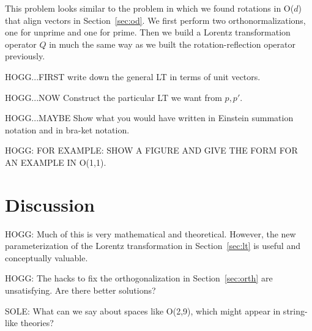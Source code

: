 \documentclass{article}
\newcommand{\secref}[1]{Section~\ref{#1}}
\begin{document}
This problem looks similar to the problem in which we found rotations in O($d$) that align vectors in \secref{sec:od}.
We first perform two orthonormalizations, one for unprime and one for prime.
Then we build a Lorentz transformation operator $Q$ in much the same way as we built the rotation-reflection operator previously.

HOGG...FIRST write down the general LT in terms of unit vectors.

HOGG...NOW Construct the particular LT we want from $p, p'$.

HOGG...MAYBE Show what you would have written in Einstein summation notation and in bra-ket notation.

HOGG: FOR EXAMPLE: SHOW A FIGURE AND GIVE THE FORM FOR AN EXAMPLE IN O(1,1).

\section{Discussion}\label{sec:discussion}

HOGG: Much of this is very mathematical and theoretical.
However, the new parameterization of the Lorentz transformation in \secref{sec:lt} is useful and conceptually valuable.

HOGG: The hacks to fix the orthogonalization in \secref{sec:orth} are unsatisfying. Are there better solutions?

SOLE: What can we say about spaces like O(2,9), which might appear in string-like theories?

\raggedright
\printbibliography
\end{document}
